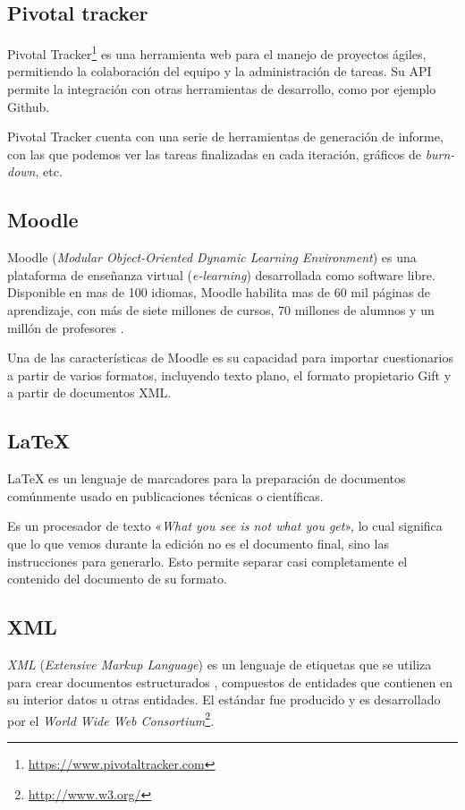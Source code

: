 \subsection{Pivotal tracker}
Pivotal Tracker\footnote{\url{https://www.pivotaltracker.com}} es una herramienta web para el manejo de proyectos ágiles, permitiendo la colaboración del equipo y la administración de tareas.
Su API permite la integración con otras herramientas de desarrollo, como por ejemplo Github.

Pivotal Tracker cuenta con una serie de herramientas de generación de informe, con las que podemos ver las tareas finalizadas en cada iteración, gráficos de \emph{burn-down}, etc.

\subsection{Moodle}
Moodle (\emph{Modular Object-Oriented Dynamic Learning Environment}) es una plataforma de enseñanza virtual (\emph{e-learning}) desarrollada como software libre.
Disponible en mas de 100 idiomas, Moodle habilita mas de 60 mil páginas de aprendizaje, con más de siete millones de cursos, 70 millones de alumnos y un millón de profesores \cite{website:moodle}.

Una de las características de Moodle es su capacidad para importar cuestionarios a partir de varios formatos, incluyendo texto plano, el formato propietario Gift y a partir de documentos XML.

\subsection{\LaTeX{}}
\LaTeX{} es un lenguaje de marcadores para la preparación de documentos comúnmente usado en publicaciones técnicas o científicas.

Es un procesador de texto «\emph{What you see is not what you get}», lo cual significa que lo que vemos durante la edición no es el 
documento final, sino las instrucciones para generarlo.
Esto permite separar casi completamente el contenido del documento de su formato.

\subsection{XML}
\emph{XML} (\emph{Extensive Markup Language}) es un lenguaje de etiquetas que se utiliza para crear documentos estructurados \cite{website:xml}, compuestos de entidades que contienen en su interior datos u otras entidades.
El estándar fue producido y es desarrollado por el \emph{World Wide Web Consortium}\footnote{\url{http://www.w3.org/}}.

